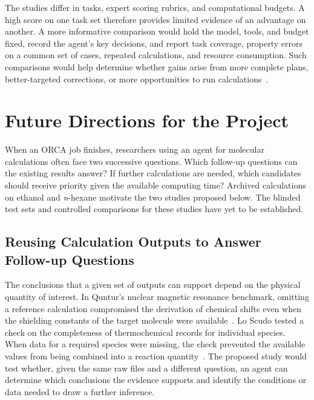 \documentclass[a4paper,11pt]{article}
\begin{document}
The studies differ in tasks, expert scoring rubrics, and computational budgets.
A high score on one task set therefore provides limited evidence of an
advantage on another.
A more informative comparison would hold the model, tools, and budget fixed,
record the agent's key decisions, and report task coverage, property errors
on a common set of cases, repeated calculations, and resource consumption.
Such comparisons would help determine whether gains arise from more complete
plans, better-targeted corrections, or more opportunities to run
calculations~\cite{quntur,mr,autodft}.

\section{Future Directions for the Project}

When an ORCA job finishes, researchers using an agent for molecular calculations
often face two successive questions.
Which follow-up questions can the existing results answer?
If further calculations are needed, which candidates should receive priority
given the available computing time?
Archived calculations on ethanol and \emph{n}-hexane motivate the two studies
proposed below.
The blinded test sets and controlled comparisons for these studies have yet
to be established.

\subsection{Reusing Calculation Outputs to Answer Follow-up Questions}

The conclusions that a given set of outputs can support depend on the physical
quantity of interest.
In Quntur's nuclear magnetic resonance benchmark, omitting a reference calculation
compromised the derivation of chemical shifts even when the shielding constants
of the target molecule were available~\cite{quntur}.
Lo Scudo tested a check on the completeness of thermochemical records for
individual species. When data for a required species were missing, the check
prevented the available values from being combined into a reaction
quantity~\cite{tracestate}.
The proposed study would test whether, given the same raw files and a different
question, an agent can determine which conclusions the evidence supports
and identify the conditions or data needed to draw a further inference.
\end{document}
